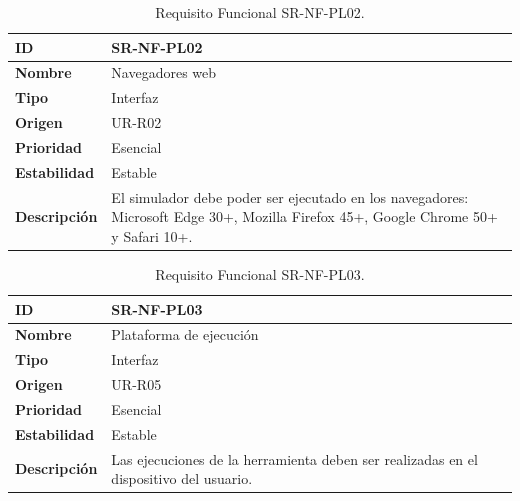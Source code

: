 \begin{center}
\begin{table}[htbp]
\centering
\begin{tabular}{@{}p{2.5cm} p{9cm}@{}} 
\toprule
\textbf{ID} 				& SR-NF-PL02 \\
\midrule
\textbf{Nombre} 			& Navegadores web \\
\midrule
\textbf{Tipo} 			& Interfaz \\
\midrule
\textbf{Origen} 			& UR-R02 \\
\midrule
\textbf{Prioridad}		& Esencial \\
\midrule
\textbf{Estabilidad} 		& Estable \\
\midrule
\textbf{Descripción} 	& El simulador debe poder ser ejecutado en los navegadores: Microsoft Edge 30+, Mozilla Firefox 45+, Google Chrome 50+ y Safari 10+. \\
\bottomrule
\end{tabular}
\caption{Requisito Funcional SR-NF-PL02.}
\label{tab:srnfpl02}
\end{table}
\end{center}

\begin{center}
\begin{table}[htbp]
\centering
\begin{tabular}{@{}p{2.5cm} p{9cm}@{}} 
\toprule
\textbf{ID} 				& SR-NF-PL03 \\
\midrule
\textbf{Nombre} 			& Plataforma de ejecución \\
\midrule
\textbf{Tipo} 			& Interfaz \\
\midrule
\textbf{Origen} 			& UR-R05 \\
\midrule
\textbf{Prioridad}		& Esencial \\
\midrule
\textbf{Estabilidad} 		& Estable \\
\midrule
\textbf{Descripción} 	& Las ejecuciones de la herramienta deben ser realizadas en el dispositivo del usuario. \\
\bottomrule
\end{tabular}
\caption{Requisito Funcional SR-NF-PL03.}
\label{tab:srnfpl03}
\end{table}
\end{center}

